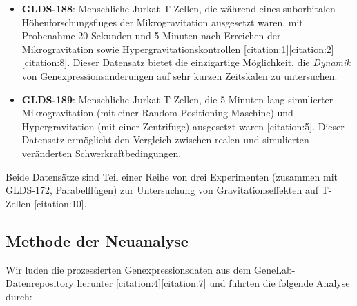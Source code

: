 \documentclass[12pt,a4paper]{article}
\theoremstyle{remark}
\begin{document}
	\begin{itemize}
		\item \textbf{GLDS-188}: Menschliche Jurkat-T-Zellen, die während eines suborbitalen Höhenforschungsfluges der Mikrogravitation ausgesetzt waren, mit Probenahme 20 Sekunden und 5 Minuten nach Erreichen der Mikrogravitation sowie Hypergravitationskontrollen [citation:1][citation:2][citation:8]. Dieser Datensatz bietet die einzigartige Möglichkeit, die \textit{Dynamik} von Genexpressionsänderungen auf sehr kurzen Zeitskalen zu untersuchen.
		
		\item \textbf{GLDS-189}: Menschliche Jurkat-T-Zellen, die 5 Minuten lang simulierter Mikrogravitation (mit einer Random-Positioning-Maschine) und Hypergravitation (mit einer Zentrifuge) ausgesetzt waren [citation:5]. Dieser Datensatz ermöglicht den Vergleich zwischen realen und simulierten veränderten Schwerkraftbedingungen.
	\end{itemize}
	
	Beide Datensätze sind Teil einer Reihe von drei Experimenten (zusammen mit GLDS-172, Parabelflügen) zur Untersuchung von Gravitationseffekten auf T-Zellen [citation:10].
	
	\subsection{Methode der Neuanalyse}
	
	Wir luden die prozessierten Genexpressionsdaten aus dem GeneLab-Datenrepository herunter [citation:4][citation:7] und führten die folgende Analyse durch:
	
\end{document}
